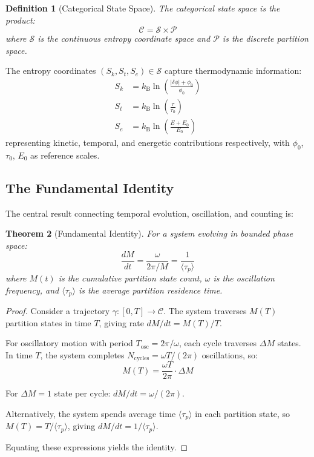 \documentclass[twocolumn,10pt]{article}
\newtheorem{theorem}{Theorem}[section]
\newtheorem{definition}[theorem]{Definition}
\newcommand{\kB}{k_{\mathrm{B}}}
\begin{document}
\begin{definition}[Categorical State Space]
\label{def:statespace}
The categorical state space is the product:
\begin{equation}
    \mathcal{C} = \mathcal{S} \times \mathcal{P}
\end{equation}
where $\mathcal{S}$ is the continuous entropy coordinate space and $\mathcal{P}$ is the discrete partition space.
\end{definition}

The entropy coordinates $(S_k, S_t, S_e) \in \mathcal{S}$ capture thermodynamic information:
\begin{align}
    S_k &= \kB \ln\left(\frac{|\delta\phi| + \phi_0}{\phi_0}\right) \\
    S_t &= \kB \ln\left(\frac{\tau}{\tau_0}\right) \\
    S_e &= \kB \ln\left(\frac{E + E_0}{E_0}\right)
\end{align}
representing kinetic, temporal, and energetic contributions respectively, with $\phi_0$, $\tau_0$, $E_0$ as reference scales.

\subsection{The Fundamental Identity}

The central result connecting temporal evolution, oscillation, and counting is:

\begin{theorem}[Fundamental Identity]
\label{thm:fundamental}
For a system evolving in bounded phase space:
\begin{equation}
    \frac{dM}{dt} = \frac{\omega}{2\pi/M} = \frac{1}{\langle\tau_p\rangle}
\end{equation}
where $M(t)$ is the cumulative partition state count, $\omega$ is the oscillation frequency, and $\langle\tau_p\rangle$ is the average partition residence time.
\end{theorem}

\begin{proof}
Consider a trajectory $\gamma: [0, T] \to \mathcal{C}$. The system traverses $M(T)$ partition states in time $T$, giving rate $dM/dt = M(T)/T$.

For oscillatory motion with period $T_{\mathrm{osc}} = 2\pi/\omega$, each cycle traverses $\Delta M$ states. In time $T$, the system completes $N_{\mathrm{cycles}} = \omega T/(2\pi)$ oscillations, so:
\begin{equation}
    M(T) = \frac{\omega T}{2\pi} \cdot \Delta M
\end{equation}

For $\Delta M = 1$ state per cycle: $dM/dt = \omega/(2\pi)$.

Alternatively, the system spends average time $\langle\tau_p\rangle$ in each partition state, so $M(T) = T/\langle\tau_p\rangle$, giving $dM/dt = 1/\langle\tau_p\rangle$.

Equating these expressions yields the identity.
\end{proof}
\end{document}
